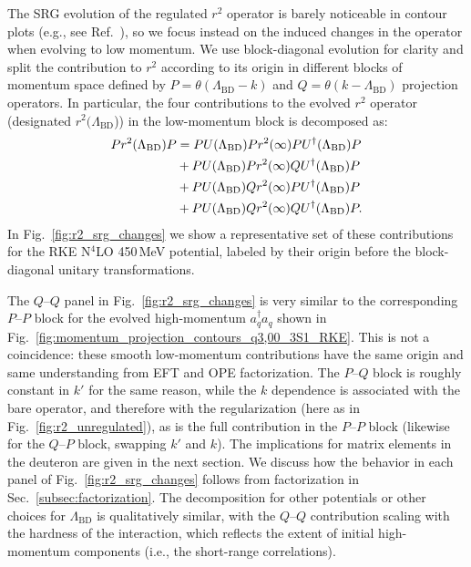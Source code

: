 \documentclass[10pt,aps,prc,floatfix,twocolumn,nofootinbib]{revtex4-1}
\newcommand{\LambdaBD}{{\Lambda_{\text{BD}}}}
\newcommand{\ataq}{a^{\dagger}_q a_q}
\newcommand{\PP}{\ensuremath{P\mbox{--}P}}
\newcommand{\PQ}{\ensuremath{P\mbox{--}Q}}
\newcommand{\QP}{\ensuremath{Q\mbox{--}P}}
\newcommand{\QQ}{\ensuremath{Q\mbox{--}Q}}
\begin{document}
The SRG evolution of the regulated $r^2$ operator is barely noticeable in contour plots (e.g., see Ref.~\cite{Anderson:2010aq}), so we focus instead on the induced changes in the operator when evolving to low momentum.
We use block-diagonal evolution for clarity and split the contribution to $r^2$ according to its origin in different blocks of momentum space defined by $P = \theta (\LambdaBD - k)$ and $Q = \theta(k - \LambdaBD)$ projection operators.
In particular, the four contributions to the evolved $r^2$ operator (designated $r^2(\LambdaBD$)) in the low-momentum block is decomposed as:
%
\begin{align}
    \label{eq:r2_PP_contributions}
    P r^2(\LambdaBD) P &= P U(\LambdaBD) P r^2(\infty) P U^{\dagger}(\LambdaBD) P \nonumber \\
    & \null + P U(\LambdaBD) P r^2(\infty) Q U^{\dagger}(\LambdaBD) P \nonumber \\
    & \null + P U(\LambdaBD) Q r^2(\infty) P U^{\dagger}(\LambdaBD) P \nonumber \\
    & \null + P U(\LambdaBD) Q r^2(\infty) Q U^{\dagger}(\LambdaBD) P.
\end{align}
%
In Fig.~\ref{fig:r2_srg_changes} we show a representative set of these contributions for the RKE N$^4$LO 450\,MeV potential, labeled by their origin before the block-diagonal unitary transformations.


The $\QQ$ panel in Fig.~\ref{fig:r2_srg_changes} is very similar to the corresponding $\PP$ block for the evolved high-momentum $\ataq$ shown in Fig.~\ref{fig:momentum_projection_contours_q3,00_3S1_RKE}.
This is not a coincidence: these smooth low-momentum contributions have the same origin and same understanding from EFT and OPE factorization.
The $\PQ$ block is roughly constant in $k'$ for the same reason, while the $k$ dependence is associated with the bare operator, and therefore with the regularization (here as in Fig.~\ref{fig:r2_unregulated}), as is the full contribution in the $\PP$ block (likewise for the $\QP$ block, swapping $k'$ and $k$).
The implications for matrix elements in the deuteron are given in the next section.
We discuss how the behavior in each panel of Fig.~\ref{fig:r2_srg_changes} follows from factorization in Sec.~\ref{subsec:factorization}.
The decomposition for other potentials or other choices for $\LambdaBD$ is qualitatively similar, with the $\QQ$ contribution scaling with the hardness of the interaction, which reflects the extent of initial high-momentum components (i.e., the short-range correlations).
\end{document}
